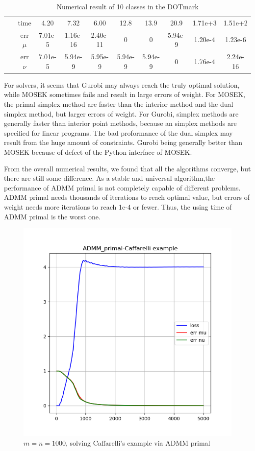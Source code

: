 \documentclass{article}
\begin{document}
\begin{large}
\begin{table}[H]
\begin{tabular}{|c|c|cccccccc|}
    ~&time&4.20&7.32&6.00&12.8&13.9&20.9&1.71e+3&1.51e+2\\   
    ~&err $\mu$&7.01e-5&1.16e-16&2.40e-11&0&0&5.94e-9&1.20e-4&1.23e-6\\   
    ~&err $\nu$&7.01e-5&5.94e-9&5.95e-9&5.94e-9&5.94e-9&0&1.76e-4&2.24e-16\\
  \hline
  \end{tabular}
  \caption{\label{tab:table1}Numerical result of 10 classes in the DOTmark}
\end{table}
For solvers, it seems that Gurobi may always reach the truly optimal solution, while MOSEK sometimes fails and result in large errors of weight. For MOSEK, the primal simplex method are faster than the interior method and the dual simplex method, but larger errors of weight. For Gurobi, simplex methods are generally faster than interior point methods, because an simplex methods are specified for linear programs. The bad proformance of the dual simplex may result from the huge amount of constraints.
Gurobi being generally better than MOSEK because of defect of the Python interface of MOSEK.

From the overall numerical results,  we found that all the algorithms converge, but there are still some difference. As a stable and universal algorithm,the performance of ADMM primal is  not completely capable of different problems. ADMM primal needs thousands of iterations to reach optimal value, but errors of weight needs more iterations to reach 1e-4 or fewer. Thus, the using time of ADMM primal is the worst one.
\begin{figure}[h]
  \centering
  \includegraphics[width=.8\textwidth]{loss1.png}
  \captionsetup{justification=centering}
  \caption{\label{fig:loss}$m=n=1000$, solving Caffarelli’s example via ADMM primal}
\end{figure}


\end{large}
\end{document}
